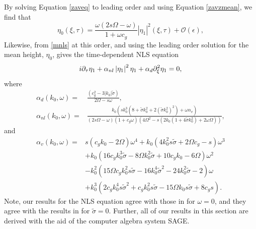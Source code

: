 \documentclass{JFM_Style/jfm}
\begin{document}
By solving Equation \eqref{zaveq} to leading order and using Equation \eqref{zavzmean}, we find that
\begin{equation}
\eta_{0}(\xi,\tau) = \frac{\omega(2s\Omega-\omega)}{1+\omega c_{g}}\left|\eta_{1}\right|^{2}(\xi,\tau) +\mathcal{O}(\epsilon),
\label{zavsol}
\end{equation}
Likewise, from \eqref{mnls} at this order, and using the leading order solution for the mean height, $\eta_{0}$, gives the time-dependent NLS equation
\begin{equation}
i\partial_{\tau}\eta_{1} + \alpha_{nl}\left|\eta_{1}\right|^{2}\eta_{1} + \alpha_{d}\partial_{\xi}^{2}\eta_{1} = 0,
\label{NLSS}
\end{equation}
where
\begin{align*}
\alpha_{d}(k_{0},\omega) = & \frac{(c^2_{g} - 3|k_{0}|\tilde{\sigma})}{2\Omega-s\omega},\\
\alpha_{nl}(k_{0},\omega) = & \frac{k_{0}\left( sk_{0}^{3}\left(8 + \tilde{\sigma}k_{0}^{2} + 2(\tilde{\sigma}k_{0}^{2})^{2}\right) + \omega \alpha_{v}\right)}{\left(2s\Omega -\omega\right)(1+c_{g}\omega)\left(4\Omega^2-s(2k_{0}(1+4\tilde{\sigma}k_{0}^{2})+2\omega\Omega)\right)},
\end{align*}
and
\begin{align*}
\alpha_{v}(k_{0},\omega)= & s(c_g k_0  - 2\Omega ) \omega^4 + k_{0}(4 k_{0}^{2} s \tilde{\sigma} + 2 \Omega c_g  -s) \omega^3 \\
& + k_{0}(16 c_g k_{0}^{3} \tilde{\sigma} - 8 \Omega k_{0}^{2} \tilde{\sigma} + 10 c_g k_{0} - 6 \Omega) \omega^2 \\
& -  k_{0}^{2}(15 \Omega c_g k_0^2 s \tilde{\sigma} - 16 k_{0}^{4} \tilde{\sigma}^2 - 24 k_{0}^{2} \tilde{\sigma} - 2 ) \omega \\
& + k_{0}^{3}(2 c_g k_{0}^{4} s \tilde{\sigma}^2 + c_g k_{0}^{2} s \tilde{\sigma} - 15 \Omega k_{0}  s \tilde{\sigma} + 8c_g s).
\end{align*}
Note, our results for the NLS equation agree with those in \cite{afm} for $\omega=0$, and they agree with the results in \cite{thomas2012nonlinear} for $\tilde{\sigma}=0$.  Further, all of our results in this section are derived with the aid of the computer algebra system SAGE.
\end{document}
